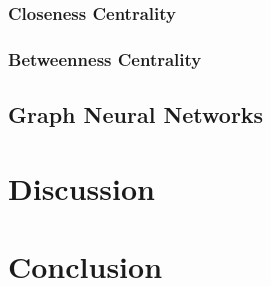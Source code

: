 \documentclass[journal,twoside,web]{ieeecolor}
\begin{document}
\subsubsection{Closeness Centrality}
\subsubsection{Betweenness Centrality}


\subsection{Graph Neural Networks}
\label{sec:gnn}

\section{Discussion}
\label{sec:discussion}

\section{Conclusion}
\label{sec:conclusion}
\end{document}
